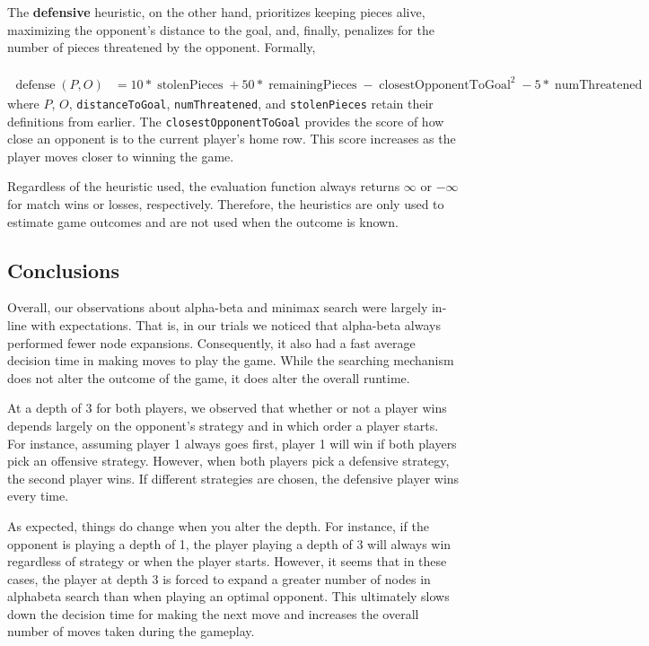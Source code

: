 \documentclass{article}
\begin{document}
The \textbf{defensive} heuristic, on the other hand, prioritizes keeping pieces alive, maximizing the opponent's distance to the goal, and, finally, penalizes for the number of pieces threatened by the opponent. Formally,
\\\\
$
\begin{aligned}
\operatorname{defense}(P, O) &= 10 * \operatorname{stolenPieces} + 50 * \operatorname{remainingPieces} - \operatorname{closestOpponentToGoal}^2 - 5 * \operatorname{numThreatened}
\end{aligned}
$
\\

where $P$, $O$, \texttt{distanceToGoal}, \texttt{numThreatened}, and \texttt{stolenPieces} retain their definitions from earlier. The \texttt{closestOpponentToGoal} provides the score of how close an opponent is to the current player's home row. This score increases as the player moves closer to winning the game.

Regardless of the heuristic used, the evaluation function always returns $\infty$ or $-\infty$ for match wins or losses, respectively. Therefore, the heuristics are only used to estimate game outcomes and are not used when the outcome is known.

\subsection{Conclusions}
Overall, our observations about alpha-beta and minimax search were largely in-line with expectations. That is, in our trials we noticed that alpha-beta always performed fewer node expansions. Consequently, it also had a fast average decision time in making moves to play the game. While the searching mechanism does not alter the outcome of the game, it does alter the overall runtime.

At a depth of 3 for both players, we observed that whether or not a player wins depends largely on the opponent's strategy and in which order a player starts. For instance, assuming player 1 always goes first, player 1 will win if both players pick an offensive strategy. However, when both players pick a defensive strategy, the second player wins. If different strategies are chosen, the defensive player wins every time.

As expected, things do change when you alter the depth. For instance, if the opponent is playing a depth of 1, the player playing a depth of 3 will always win regardless of strategy or when the player starts. However, it seems that in these cases, the player at depth 3 is forced to expand a greater number of nodes in alphabeta search than when playing an optimal opponent. This ultimately slows down the decision time for making the next move and increases the overall number of moves taken during the gameplay.
\end{document}
